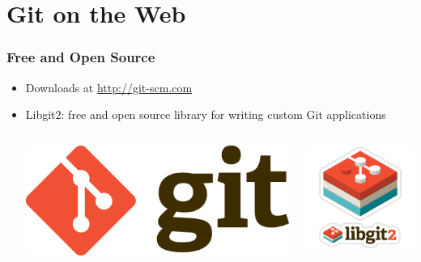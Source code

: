 \documentclass[english,compress]{beamer}
\begin{document}
\section{Git on the Web}
\frame
{
    \frametitle{Free and Open Source}

    \begin{itemize}
        \item Downloads at \url{http://git-scm.com}
        \item Libgit2: free and open source library for writing custom Git applications
        \begin{columns}
            \begin{column}{.5\textwidth}
                \begin{center}
                    \includegraphics[width=1\textwidth]{figs/git-logo1.png}
                \end{center}
            \end{column}
            \begin{column}{.5\textwidth}
                \begin{center}
                    \includegraphics[width=1\textwidth]{figs/libgit-logo.png}
                \end{center}
            \end{column}
        \end{columns}
    \end{itemize}
}
\end{document}
